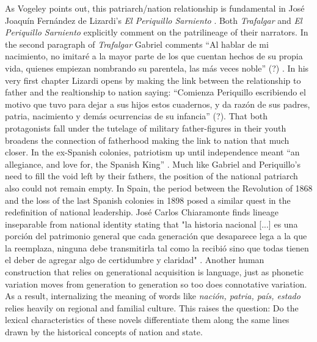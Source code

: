 \documentclass[12pt]{report}
\begin{document}
As Vogeley points out, this patriarch/nation relationship is fundamental in José Joaquín Fernández de Lizardi's \textit{El Periquillo Sarniento} \cite[99]{Vogeley2001}.
Both \textit{Trafalgar} and \textit{El Periquillo Sarniento} explicitly comment on the patrilineage of their narrators.
In the second paragraph of \textit{Trafalgar} Gabriel comments \enquote{Al hablar de mi nacimiento, no imitaré a la mayor parte de los que
cuentan hechos de su propia vida, quienes empiezan nombrando su parentela, las más veces noble} (?) \cite[add. text]{Galdós1882}.
In his very first chapter Lizardi opens by making the link between the relationship to father and the realtionship to nation saying: \enquote{Comienza Periquillo escribiendo el motivo que tuvo para dejar a sus hijos estos cuadernos, y da razón de sus padres, patria, nacimiento y demás ocurrencias de su infancia} (?). 
That both protagonists fall under the tutelage of military father-figures in their youth broadens the connection of fatherhood making the link to nation that much closer.
In the ex-Spanish colonies, patriotism up until independence meant \enquote{an allegiance, and love for, the Spanish King} \cite[94]{Vogeley2001}.
Much like Gabriel and Periquillo's need to fill the void left by their fathers, the position of the national patriarch also could not remain empty.
In Spain, the period between the Revolution of 1868 and the loss of the last Spanish colonies in 1898 posed a similar quest in the redefinition of national leadership.
José Carlos Chiaramonte finds lineage inseparable from national identity stating that "la historia nacional [...] es una porción del patrimonio general que cada generación que desaparece lega a la que la reemplaza, ninguna debe transmitirla tal como la recibió sino que todas tienen el deber de agregar algo de certidumbre y claridad" \cite[28]{Chiaramonte2004}.
Another human construction that relies on generational acquisition is language, just as phonetic variation moves from generation to generation so too does connotative variation.
As a result, internalizing the meaning of words like \textit{nación, patria, país, estado} relies heavily on regional and familial culture. 
This raises the question: Do the lexical characteristics of these novels differentiate them along the same lines drawn by the historical concepts of nation and state.

\end{document}
